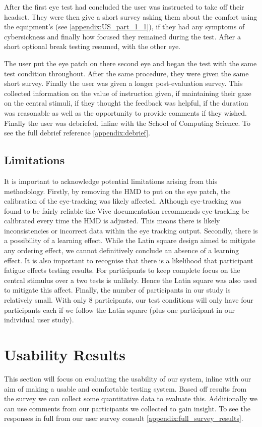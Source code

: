\documentclass{l4proj}
\begin{document}
After the first eye test had concluded the user was instructed to take off their headset. They were then give a short survey asking them about the comfort using the equipment's (see \ref{appendix:US_part_1_1}), if they had any symptoms of cybersickness and finally how focused they remained during the test. After a short optional break testing resumed, with the other eye.

The user put the eye patch on there second eye and began the test with the same test condition throughout. After the same procedure, they were given the same short survey. Finally the user was given a longer post-evaluation survey. This collected information on the value of instruction given, if maintaining their gaze on the central stimuli, if they thought the feedback was helpful, if the duration was reasonable as well as the opportunity to provide comments if they wished. Finally the user was debriefed, inline with the School of Computing Science. To see the full debrief reference \ref{appendix:debrief}.
\subsection{Limitations}
It is important to acknowledge potential limitations arising from this methodology. Firstly, by removing the HMD to put on the eye patch, the calibration of the eye-tracking was likely affected. Although eye-tracking was found to be fairly reliable the Vive documentation recommends eye-tracking be calibrated every time the HMD is adjusted. This means there is likely inconsistencies or incorrect data within the eye tracking output. Secondly, there is a possibility of a learning effect. While the Latin square design aimed to mitigate any ordering effect, we cannot definitively conclude an absence of a learning effect. It is also important to recognise that there is a likelihood that participant fatigue effects testing results. For participants to keep complete focus on the central stimulus over a two tests is unlikely. Hence the Latin square was also used to mitigate this affect. Finally, the number of participants in our study is relatively small. With only 8 participants, our test conditions will only have four participants each if we follow the Latin square (plus one participant in our individual user study). 
\section{Usability Results}
This section will focus on evaluating the usability of our system, inline with our aim of making a usable and comfortable testing system. Based off results from the survey we can collect some quantitative data to evaluate this. Additionally we can use comments from our participants we collected to gain insight. To see the responses in full from our user survey consult \ref{appendix:full_survey_results}.
\end{document}
